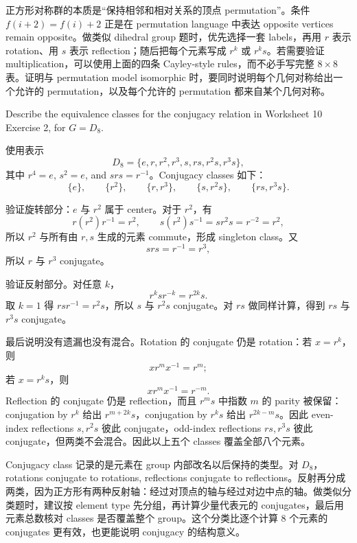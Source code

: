 \begin{explanation}
正方形对称群的本质是“保持相邻和相对关系的顶点 permutation”。条件 \(f(i+2)=f(i)+2\) 正是在 permutation language 中表达 opposite vertices remain opposite。做类似 dihedral group 题时，优先选择一套 labels，再用 \(r\) 表示 rotation、用 \(s\) 表示 reflection；随后把每个元素写成 \(r^k\) 或 \(r^k s\)。若需要验证 multiplication，可以使用上面的四条 Cayley-style rules，而不必手写完整 \(8\times8\) 表。证明与 permutation model isomorphic 时，要同时说明每个几何对称给出一个允许的 permutation，以及每个允许的 permutation 都来自某个几何对称。
\end{explanation}

\begin{exerciseblock}
Describe the equivalence classes for the conjugacy relation in Worksheet 10 Exercise 2, for \(G=D_8\).
\end{exerciseblock}

\begin{solution}
使用表示
\[
  D_8=\{e,r,r^2,r^3,s,rs,r^2s,r^3s\},
\]
其中 \(r^4=e\), \(s^2=e\), and \(srs=r^{-1}\)。Conjugacy classes 如下：
\[
  \{e\},
  \qquad
  \{r^2\},
  \qquad
  \{r,r^3\},
  \qquad
  \{s,r^2s\},
  \qquad
  \{rs,r^3s\}.
\]

验证旋转部分：\(e\) 与 \(r^2\) 属于 center。对于 \(r^2\)，有
\[
  r(r^2)r^{-1}=r^2,
  \qquad
  s(r^2)s^{-1}=sr^2s=r^{-2}=r^2,
\]
所以 \(r^2\) 与所有由 \(r,s\) 生成的元素 commute，形成 singleton class。又
\[
  srs=r^{-1}=r^3,
\]
所以 \(r\) 与 \(r^3\) conjugate。

验证反射部分。对任意 \(k\)，
\[
  r^k s r^{-k}=r^{2k}s.
\]
取 \(k=1\) 得 \(rsr^{-1}=r^2s\)，所以 \(s\) 与 \(r^2s\) conjugate。对 \(rs\) 做同样计算，得到 \(rs\) 与 \(r^3s\) conjugate。

最后说明没有遗漏也没有混合。Rotation 的 conjugate 仍是 rotation：若 \(x=r^k\)，则
\[
  x r^m x^{-1}=r^m;
\]
若 \(x=r^k s\)，则
\[
  x r^m x^{-1}=r^{-m}.
\]
Reflection 的 conjugate 仍是 reflection，而且 \(r^m s\) 中指数 \(m\) 的 parity 被保留：conjugation by \(r^k\) 给出 \(r^{m+2k}s\)，conjugation by \(r^k s\) 给出 \(r^{2k-m}s\)。因此 even-index reflections \(s,r^2s\) 彼此 conjugate，odd-index reflections \(rs,r^3s\) 彼此 conjugate，但两类不会混合。因此以上五个 classes 覆盖全部八个元素。
\end{solution}

\begin{explanation}
Conjugacy class 记录的是元素在 group 内部改名以后保持的类型。对 \(D_8\)，rotations conjugate to rotations, reflections conjugate to reflections。反射再分成两类，因为正方形有两种反射轴：经过对顶点的轴与经过对边中点的轴。做类似分类题时，建议按 element type 先分组，再计算少量代表元的 conjugates，最后用元素总数核对 classes 是否覆盖整个 group。这个分类比逐个计算 \(8\) 个元素的 conjugates 更有效，也更能说明 conjugacy 的结构意义。
\end{explanation}

